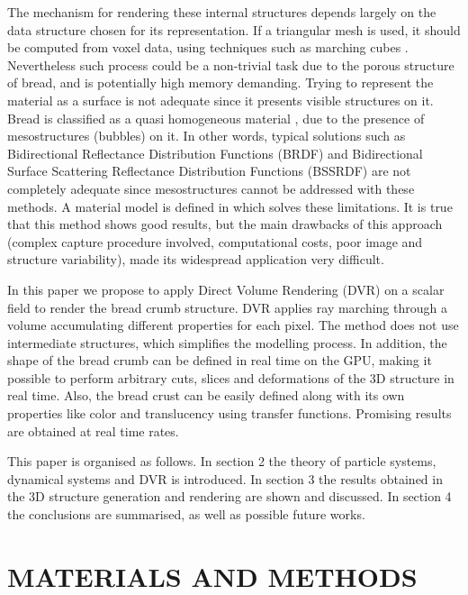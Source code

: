 \documentclass[oneside,a4paper,english,links]{amca}
\begin{document}
The mechanism for rendering these internal structures depends largely
on the data structure chosen for its representation. If a triangular
mesh is used, it should be computed from voxel data, using
techniques such as marching cubes \citep{Lorensen1987}. Nevertheless
such process could be a non-trivial task due to the porous structure
of bread, and is potentially high memory demanding. Trying to
represent the material as a surface is not adequate since it presents
visible structures on it. Bread is classified as a quasi homogeneous
material \citep{Tong2005}, due to the presence of mesostructures
(bubbles) on it. In other words, typical solutions such as
Bidirectional Reflectance Distribution Functions (BRDF)
\citep{Kurt2009} and Bidirectional Surface Scattering Reflectance
Distribution Functions (BSSRDF) \citep{Donner2009} are not completely
adequate since mesostructures cannot be addressed with these
methods. A material model is defined in \citep{Tong2005} which solves
these limitations. It is true that this method shows good results, but
the main drawbacks of this approach (complex capture procedure
involved, computational costs, poor image and structure variability),
made its widespread application very difficult.

In this paper we propose to apply Direct Volume Rendering (DVR)
\citep{Levoy1988,Kruger2003, Kratz2006} on a scalar field to render
the bread crumb structure. DVR applies ray marching through a volume
accumulating different properties for each pixel. The method does not
use intermediate structures, which simplifies the modelling
process. In addition, the shape of the bread crumb can be defined in
real time on the GPU, making it possible to perform arbitrary cuts,
slices and deformations of the 3D structure in real time. Also, the
bread crust can be easily defined along with its own properties like
color and translucency using transfer functions. Promising results
are obtained at real time rates.

This paper is organised as follows. In section 2 the theory of
particle systems, dynamical systems and DVR is introduced. In section
3 the results obtained in the 3D structure generation and rendering
are shown and discussed. In section 4 the conclusions are summarised,
as well as possible future works.

\section{MATERIALS AND METHODS}
\end{document}
